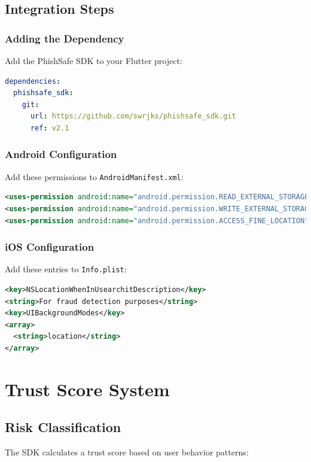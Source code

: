 \documentclass[11pt]{article}
\begin{document}
\subsection{Integration Steps}

\subsubsection{Adding the Dependency}
Add the PhishSafe SDK to your Flutter project:

\begin{lstlisting}[language=yaml]
dependencies:
  phishsafe_sdk:
    git:
      url: https://github.com/swrjks/phishsafe_sdk.git
      ref: v2.1
\end{lstlisting}

\subsubsection{Android Configuration}
Add these permissions to \texttt{AndroidManifest.xml}:

\begin{lstlisting}[language=xml]
<uses-permission android:name="android.permission.READ_EXTERNAL_STORAGE" />
<uses-permission android:name="android.permission.WRITE_EXTERNAL_STORAGE" />
<uses-permission android:name="android.permission.ACCESS_FINE_LOCATION" />
\end{lstlisting}

\subsubsection{iOS Configuration}
Add these entries to \texttt{Info.plist}:

\begin{lstlisting}[language=xml]
<key>NSLocationWhenInUsearchitDescription</key>
<string>For fraud detection purposes</string>
<key>UIBackgroundModes</key>
<array>
  <string>location</string>
</array>
\end{lstlisting}

\clearpage
\section{Trust Score System}

\subsection{Risk Classification}
The SDK calculates a trust score based on user behavior patterns:
\end{document}
